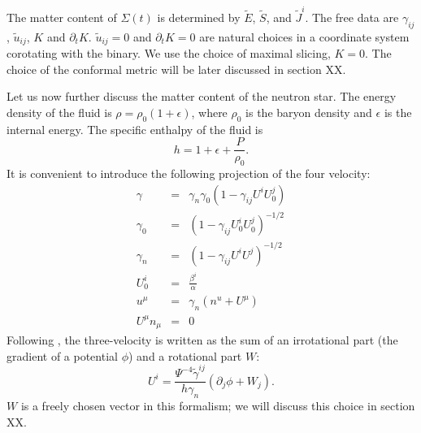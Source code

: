 The matter content of $\Sigma(t)$ is determined by $\tilde{E}$,
$\tilde{S}$, and $\tilde{J}^i$. The free data are $\gamma_{ij}$,
$\tilde{u}_{ij}$, $K$ and $\partial_t K$. $\tilde{u}_{ij}=0$ and
$\partial_t K=0$ are natural choices in a coordinate system corotating
with the binary. We use the choice of maximal slicing, $K=0$. The
choice of the conformal metric will be later discussed in section XX.

Let us now further discuss the matter content of the neutron star. The
energy density of the fluid is $\rho=\rho_0\left(1+\epsilon\right)$,
where $\rho_0$ is the baryon density and $\epsilon$ is the internal
energy. The specific enthalpy of the fluid is
\begin{equation}
h=1+\epsilon+\frac{P}{\rho_0}.
\end{equation}
It is convenient to introduce the following projection of the four
velocity:
\begin{eqnarray}
\gamma &=& \gamma_n\gamma_0\left(1-\gamma_{ij}U^iU^j_0\right) \\
\gamma_0 &=& \left(1 - \gamma_{ij}U^i_0U^j_0\right)^{-1/2} \\
\gamma_n &=& \left(1 - \gamma_{ij}U^iU^j\right)^{-1/2} \\
U^i_0 &=& \frac{\beta^i}{\alpha} \\
u^{\mu} &=& \gamma_n\left(n^u+U^\mu\right) \\
U^{\mu}n_{\mu}&=&0
\end{eqnarray}
Following \cite{Tichy:2011gw}, the three-velocity is written as the sum
of an irrotational part (the gradient of a potential $\phi$) and a
rotational part $W$:
\begin{equation}
U^i =
\frac{\Psi^{-4}\tilde{\gamma}^{ij}}{h\gamma_n}\left(\partial_j\phi+W_j\right).
\end{equation}
$W$ is a freely chosen vector in this formalism; we will discuss this choice in section XX.

